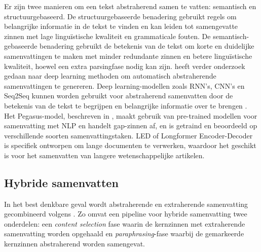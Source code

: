 Er zijn twee manieren om een tekst abstraherend samen te vatten: semantisch en structuurgebaseerd. De structuurgebaseerde benadering gebruikt regels om belangrijke informatie in de tekst te vinden en kan leiden tot samengevatte zinnen met lage linguïstische kwaliteit en grammaticale fouten. De semantisch-gebaseerde benadering gebruikt de betekenis van de tekst om korte en duidelijke samenvattingen te maken met minder redundante zinnen en betere linguïstische kwaliteit, hoewel een extra parsingfase nodig kan zijn. \textcite{Cao2022} heeft verder onderzoek gedaan naar deep learning methoden om automatisch abstraherende samenvattingen te genereren. Deep learning-modellen zoals RNN's, CNN's en Seq2Seq kunnen worden gebruikt voor abstraherend samenvatten door de betekenis van de tekst te begrijpen en belangrijke informatie over te brengen \autocite{Suleiman2020}. Het Pegasus-model, beschreven in \textcite{Zhang2020}, maakt gebruik van pre-trained modellen voor samenvatting met NLP en handelt gap-zinnen af, en is getraind en beoordeeld op verschillende soorten samenvattingstaken. LED of Longformer Encoder-Decoder is specifiek ontworpen om lange documenten te verwerken, waardoor het geschikt is voor het samenvatten van langere wetenschappelijke artikelen. %


\subsection{Hybride samenvatten}

In het best denkbare geval wordt abstraherende en extraherende samenvatting gecombineerd volgens \textcite{Hsu2018, Huang2019}. Zo omvat een pipeline voor hybride samenvatting twee onderdelen: een \textit{content selection} fase waarin de kernzinnen met extraherende samenvatting worden opgehaald en \textit{paraphrasing}-fase waarbij de gemarkeerde kernzinnen abstraherend worden samengevat. 

